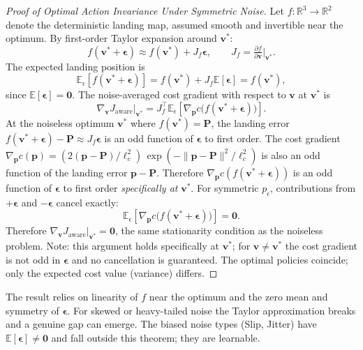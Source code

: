 \begin{proof}[Proof of Optimal Action Invariance Under Symmetric Noise]
Let $f : \mathbb{R}^3 \to \mathbb{R}^2$ denote the deterministic landing map, assumed
smooth and invertible near the optimum.
By first-order Taylor expansion around $\mathbf{v}^*$:
\[
  f(\mathbf{v}^* + \boldsymbol{\epsilon}) \approx f(\mathbf{v}^*) + J_f \boldsymbol{\epsilon},
  \qquad J_f = \tfrac{\partial f}{\partial \mathbf{v}}\big|_{\mathbf{v}^*}.
\]
The expected landing position is
\[
  \mathbb{E}_\epsilon[f(\mathbf{v}^* + \boldsymbol{\epsilon})]
  = f(\mathbf{v}^*) + J_f \mathbb{E}[\boldsymbol{\epsilon}]
  = f(\mathbf{v}^*),
\]
since $\mathbb{E}[\boldsymbol{\epsilon}] = \mathbf{0}$.
The noise-averaged cost gradient with respect to $\mathbf{v}$ at $\mathbf{v}^*$ is
\[
  \nabla_{\mathbf{v}} J_{\mathrm{aware}}\big|_{\mathbf{v}^*}
  = J_f^\top \mathbb{E}_\epsilon\!\left[\nabla_{\mathbf{p}} c\bigl(f(\mathbf{v}^*
  + \boldsymbol{\epsilon})\bigr)\right].
\]
At the noiseless optimum $\mathbf{v}^*$ where $f(\mathbf{v}^*) = \mathbf{P}$,
the landing error $f(\mathbf{v}^* + \boldsymbol{\epsilon}) - \mathbf{P} \approx
J_f \boldsymbol{\epsilon}$ is an odd function of $\boldsymbol{\epsilon}$ to first
order.
The cost gradient
$\nabla_{\mathbf{p}} c(\mathbf{p}) = (2(\mathbf{p}-\mathbf{P})/\ell_c^2)\,
\exp(-\|\mathbf{p}-\mathbf{P}\|^2/\ell_c^2)$ is also an odd function of the landing
error $\mathbf{p} - \mathbf{P}$.
Therefore $\nabla_{\mathbf{p}} c(f(\mathbf{v}^* + \boldsymbol{\epsilon}))$ is an odd
function of $\boldsymbol{\epsilon}$ to first order \emph{specifically at} $\mathbf{v}^*$.
For symmetric $p_\epsilon$, contributions from $+\boldsymbol{\epsilon}$ and
$-\boldsymbol{\epsilon}$ cancel exactly:
\[
  \mathbb{E}_\epsilon\!\left[\nabla_{\mathbf{p}} c\bigl(f(\mathbf{v}^*
  + \boldsymbol{\epsilon})\bigr)\right] = \mathbf{0}.
\]
Therefore $\nabla_{\mathbf{v}} J_{\mathrm{aware}}\big|_{\mathbf{v}^*} = \mathbf{0}$,
the same stationarity condition as the noiseless problem.
Note: this argument holds specifically at $\mathbf{v}^*$; for $\mathbf{v} \neq
\mathbf{v}^*$ the cost gradient is not odd in $\boldsymbol{\epsilon}$ and no
cancellation is guaranteed.
The optimal policies coincide; only the expected cost value (variance) differs.
\end{proof}

\begin{remark}
The result relies on linearity of $f$ near the optimum and the zero mean and symmetry of
$\boldsymbol{\epsilon}$.
For skewed or heavy-tailed noise the Taylor approximation breaks and a genuine gap can
emerge.
The biased noise types (Slip, Jitter) have $\mathbb{E}[\boldsymbol{\epsilon}] \neq
\mathbf{0}$ and fall outside this theorem; they are learnable.
\end{remark}

